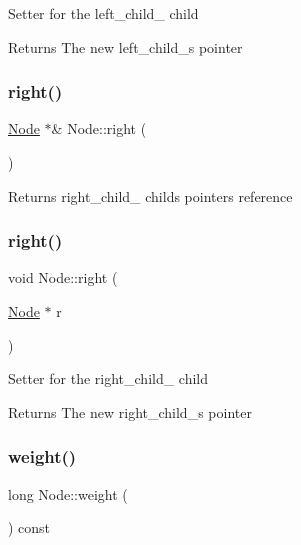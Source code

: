 Setter for the left\+\_\+child\+\_\+ child \begin{DoxyReturn}{Returns}
The new left\+\_\+child\+\_\+\textquotesingle{}s pointer 
\end{DoxyReturn}
\mbox{\label{class_node_a3eabc288cada601df9592ecf88d41220}} 
\subsubsection{\texorpdfstring{right()}{right()}\hspace{0.1cm}{\footnotesize\ttfamily [1/2]}}
{\footnotesize\ttfamily \hyperlink{class_node}{Node} $\ast$\& Node\+::right (\begin{DoxyParamCaption}{ }\end{DoxyParamCaption})}

Returns right\+\_\+child\+\_\+ child\textquotesingle{}s pointer\textquotesingle{}s reference \mbox{\label{class_node_a71398b57ef3f9a78cfd8ff455877731d}} 
\subsubsection{\texorpdfstring{right()}{right()}\hspace{0.1cm}{\footnotesize\ttfamily [2/2]}}
{\footnotesize\ttfamily void Node\+::right (\begin{DoxyParamCaption}\item[{\hyperlink{class_node}{Node} $\ast$}]{r }\end{DoxyParamCaption})}

Setter for the right\+\_\+child\+\_\+ child \begin{DoxyReturn}{Returns}
The new right\+\_\+child\+\_\+\textquotesingle{}s pointer 
\end{DoxyReturn}
\mbox{\label{class_node_a5c4198ce7dc69679ee19206ed0741b6d}} 
\subsubsection{\texorpdfstring{weight()}{weight()}\hspace{0.1cm}{\footnotesize\ttfamily [1/2]}}
{\footnotesize\ttfamily long Node\+::weight (\begin{DoxyParamCaption}{ }\end{DoxyParamCaption}) const}

